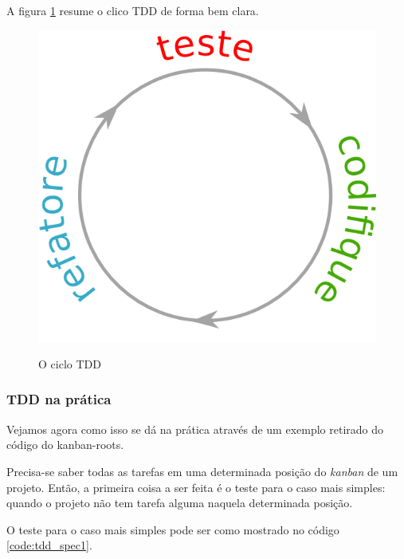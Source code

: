 A figura \ref{img:ciclo-tdd} resume o clico TDD de forma bem clara.

\begin{figure}[h]
  \center
  \caption{O ciclo TDD}
  \includegraphics[scale=0.45]{images/ciclo-tdd}
  \label{img:ciclo-tdd}
\end{figure}

\subsubsection{TDD na prática}
\label{ssub:tdd_na_pratica}

Vejamos agora como isso se dá na prática através de um exemplo retirado do código do kanban-roots.

Precisa-se saber todas as tarefas em uma determinada posição do \textit{kanban} de um projeto. Então, a primeira coisa a ser feita é o teste para o caso mais simples: quando o projeto não tem tarefa alguma naquela determinada posição.

O teste para o caso mais simples pode ser como mostrado no código \ref{code:tdd_spec1}.


